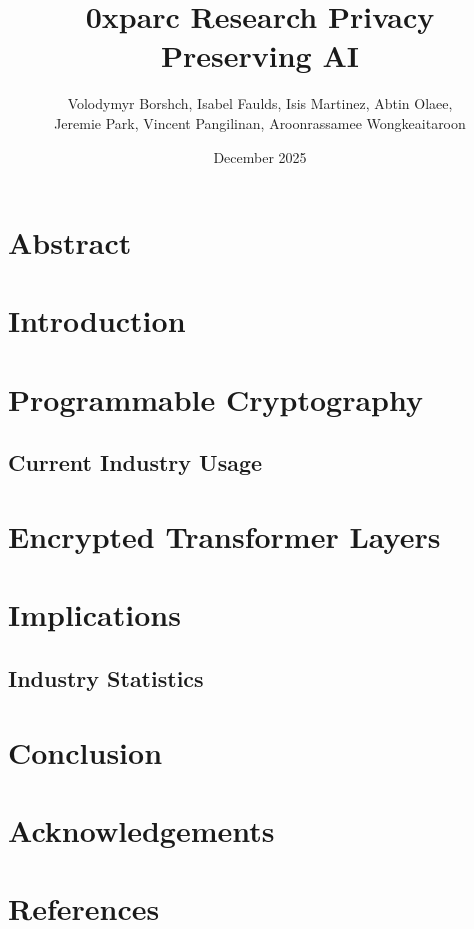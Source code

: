 \documentclass{article}
\title{0xparc Research Privacy Preserving AI}
\author{Volodymyr Borshch, Isabel Faulds, Isis Martinez, Abtin Olaee,\\ Jeremie Park, Vincent Pangilinan, Aroonrassamee Wongkeaitaroon}
\date{December 2025}
\begin{document}
\maketitle

\section{Abstract}

\section{Introduction}

\section{Programmable Cryptography}

\subsection{Current Industry Usage}

\section{Encrypted Transformer Layers}

\section{Implications}

\subsection{Industry Statistics}

\section{Conclusion}

\section{Acknowledgements}

\section{References}
\end{document}
